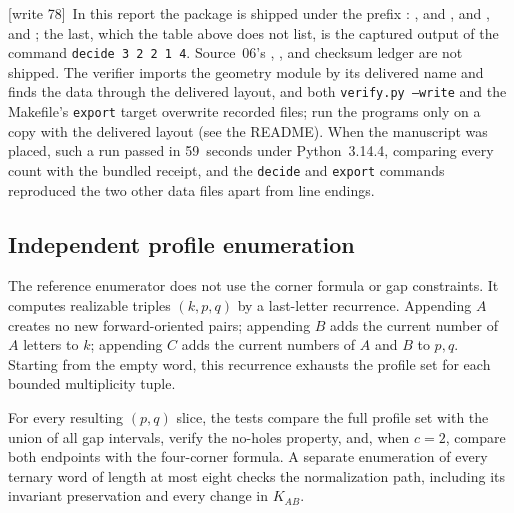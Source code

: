 \documentclass[11pt,letterpaper]{article}
\theoremstyle{definition}
\theoremstyle{remark}
\newcommand{\wtagb}{\textup{[write 78]}}
\begin{document}
\wtagb\ In this report the package is shipped under the prefix : ,  and , and ,  and ; the last, which the table above does not list, is the captured output of the command \texttt{decide 3 2 2 1 4}. Source~06's , ,  and checksum ledger are not shipped. The verifier imports the geometry module by its delivered name and finds the data through the delivered layout, and both \texttt{verify.py --write} and the Makefile's \texttt{export} target overwrite recorded files; run the programs only on a copy with the delivered layout (see the README). When the manuscript was placed, such a run passed in 59~seconds under Python~3.14.4, comparing every count with the bundled receipt, and the \texttt{decide} and \texttt{export} commands reproduced the two other data files apart from line endings.

\subsection{Independent profile enumeration}
The reference enumerator does not use the corner formula or gap constraints. It computes realizable triples $(k,p,q)$ by a last-letter recurrence. Appending $A$ creates no new forward-oriented pairs; appending $B$ adds the current number of $A$ letters to $k$; appending $C$ adds the current numbers of $A$ and $B$ to $p,q$. Starting from the empty word, this recurrence exhausts the profile set for each bounded multiplicity tuple.

For every resulting $(p,q)$ slice, the tests compare the full profile set with the union of all gap intervals, verify the no-holes property, and, when $c=2$, compare both endpoints with the four-corner formula. A separate enumeration of every ternary word of length at most eight checks the normalization path, including its invariant preservation and every change in $K_{AB}$.
\end{document}
